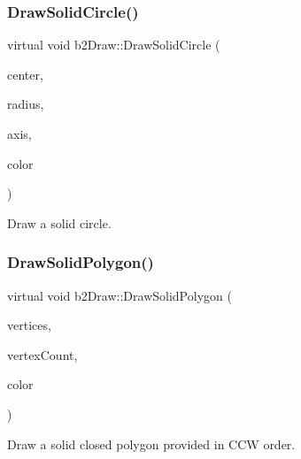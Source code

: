 \subsubsection{\texorpdfstring{DrawSolidCircle()}{DrawSolidCircle()}}
{\footnotesize\ttfamily virtual void b2\+Draw\+::\+Draw\+Solid\+Circle (\begin{DoxyParamCaption}\item[{const \mbox{\hyperlink{structb2_vec2}{b2\+Vec2}} \&}]{center,  }\item[{\mbox{\hyperlink{b2_settings_8h_aacdc525d6f7bddb3ae95d5c311bd06a1}{float32}}}]{radius,  }\item[{const \mbox{\hyperlink{structb2_vec2}{b2\+Vec2}} \&}]{axis,  }\item[{const \mbox{\hyperlink{structb2_color}{b2\+Color}} \&}]{color }\end{DoxyParamCaption})\hspace{0.3cm}{\ttfamily [pure virtual]}}



Draw a solid circle. 

\mbox{\label{classb2_draw_a76f2d67de0781a32cab116278c5c9eea}} 
\subsubsection{\texorpdfstring{DrawSolidPolygon()}{DrawSolidPolygon()}}
{\footnotesize\ttfamily virtual void b2\+Draw\+::\+Draw\+Solid\+Polygon (\begin{DoxyParamCaption}\item[{const \mbox{\hyperlink{structb2_vec2}{b2\+Vec2}} $\ast$}]{vertices,  }\item[{\mbox{\hyperlink{b2_settings_8h_a43d43196463bde49cb067f5c20ab8481}{int32}}}]{vertex\+Count,  }\item[{const \mbox{\hyperlink{structb2_color}{b2\+Color}} \&}]{color }\end{DoxyParamCaption})\hspace{0.3cm}{\ttfamily [pure virtual]}}



Draw a solid closed polygon provided in C\+CW order. 

\mbox{\label{classb2_draw_ade698123482a491a7a61fa1fe4d3a4f4}} 
